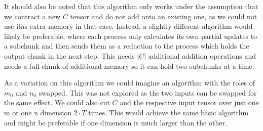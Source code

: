 It should also be noted that this algorithm only works under the assumption that we contract a new $C$ tensor and do not add onto an existing one, as we could not use itas extra memory in that case.
Instead, a slightly different algorithm would likely be preferable, where each process only calculates its own partial updates to a subchunk and then sends them as a reduction to the process which holds the output chunk in the next step.
This needs $|C|$ additional addition operations and needs a full chunk of additional memory so it can hold two subchunks at a time.

As a variation on this algorithm we could imagine an algorithm with the roles of $m_0$ and $n_0$ swapped.
This was not explored as the two inputs can be swapped for the same effect.
We could also cut $C$ and the respective input tensor over just one m or one n dimension $2 \cdot T$ times.
This would achieve the same basic algorithm and might be preferable if one dimension is much larger than the other.
